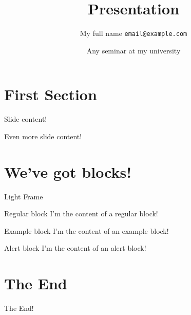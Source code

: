 \documentclass[compress]{beamer}
\title{Presentation}
\date[Seminar]{Any seminar at my university}
\author[Me]{My full name \texttt{email@example.com}}
\begin{document}
\begin{frame}
\titlepage
\end{frame}

\blankframe{}

\section{First Section}

\begin{frame} 
  Slide content!
\end{frame}

\blankframe{}

\begin{frame}
  Even more slide content!
\end{frame}

\section{We've got blocks!}

\begin{frame}{Light Frame}
\begin{block}{Regular block}
  I'm the content of a regular block!
\end{block}
\begin{exampleblock}{Example block}
  I'm the content of an example block!
\end{exampleblock}
\begin{alertblock}{Alert block}
  I'm the content of an alert block!
\end{alertblock}
\end{frame}


\section{The End}
\begin{frame}
  The End!
\end{frame}
\end{document}
